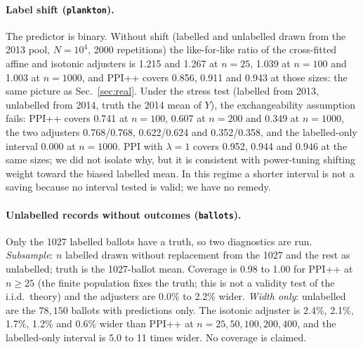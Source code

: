 \begin{table}[h]
\caption{Asymptotic CI-width ratio to power-tuned PPI++ ($N\to\infty$; 1 = parity, $<1$ narrower) per pool and control-variate class; mean $\pm$ SD over ten random 2-fold cross-fitting splits. ``--'': no features $X$ in the pool.}
\label{tab:headroom}
\centering

\end{table}

\paragraph{Label shift (\texttt{plankton}).}
The predictor is binary. Without shift (labelled and unlabelled drawn from the 2013 pool, $N=10^4$, 2000 repetitions) the like-for-like ratio of the cross-fitted affine and isotonic adjusters is 1.215 and 1.267 at $n=25$, 1.039 at $n=100$ and 1.003 at $n=1000$, and PPI++ covers 0.856, 0.911 and 0.943 at those sizes: the same picture as Sec.~\ref{sec:real}.
Under the stress test (labelled from 2013, unlabelled from 2014, truth the 2014 mean of $Y$), the exchangeability assumption fails: PPI++ covers 0.741 at $n=100$, 0.607 at $n=200$ and 0.349 at $n=1000$, the two adjusters 0.768/0.768, 0.622/0.624 and 0.352/0.358, and the labelled-only interval 0.000 at $n=1000$.
PPI with $\lambda=1$ covers 0.952, 0.944 and 0.946 at the same sizes; we did not isolate why, but it is consistent with power-tuning shifting weight toward the biased labelled mean. In this regime a shorter interval is not a saving because no interval tested is valid; we have no remedy.

\paragraph{Unlabelled records without outcomes (\texttt{ballots}).}
Only the 1027 labelled ballots have a truth, so two diagnostics are run. \emph{Subsample}: $n$ labelled drawn without replacement from the 1027 and the rest as unlabelled; truth is the 1027-ballot mean. Coverage is 0.98 to 1.00 for PPI++ at $n\ge25$ (the finite population fixes the truth; this is not a validity test of the i.i.d.\ theory) and the adjusters are 0.0\% to 2.2\% wider.
\emph{Width only}: unlabelled are the $78{,}150$ ballots with predictions only. The isotonic adjuster is 2.4\%, 2.1\%, 1.7\%, 1.2\% and 0.6\% wider than PPI++ at $n=25,50,100,200,400$, and the labelled-only interval is 5.0 to 11 times wider. No coverage is claimed.

